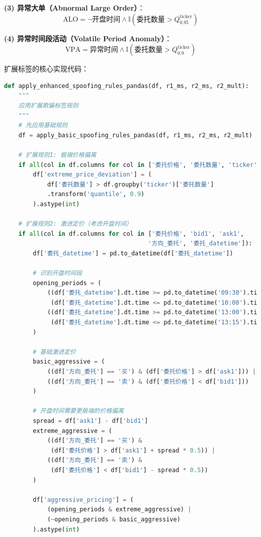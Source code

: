 \documentclass[12pt,a4paper]{article}
\begin{document}
\textbf{(3) 异常大单（Abnormal Large Order）}：
$$\text{ALO} = \neg\text{开盘时间} \land \mathbb{I}(\text{委托数量} > Q_{0.95}^{\text{ticker}})$$

\textbf{(4) 异常时间段活动（Volatile Period Anomaly）}：
$$\text{VPA} = \text{异常时间} \land \mathbb{I}(\text{委托数量} > Q_{0.9}^{\text{ticker}})$$

扩展标签的核心实现代码：

\begin{lstlisting}[language=Python, caption=扩展标签生成代码]
def apply_enhanced_spoofing_rules_pandas(df, r1_ms, r2_ms, r2_mult):
    """
    应用扩展欺骗标签规则
    """
    # 先应用基础规则
    df = apply_basic_spoofing_rules_pandas(df, r1_ms, r2_ms, r2_mult)
    
    # 扩展规则1: 极端价格偏离
    if all(col in df.columns for col in ['委托价格', '委托数量', 'ticker']):
        df['extreme_price_deviation'] = (
            df['委托数量'] > df.groupby('ticker')['委托数量']
            .transform('quantile', 0.9)
        ).astype(int)
    
    # 扩展规则2: 激进定价（考虑开盘时间）
    if all(col in df.columns for col in ['委托价格', 'bid1', 'ask1', 
                                        '方向_委托', '委托_datetime']):
        df['委托_datetime'] = pd.to_datetime(df['委托_datetime'])
        
        # 识别开盘时间段
        opening_periods = (
            ((df['委托_datetime'].dt.time >= pd.to_datetime('09:30').time()) & 
             (df['委托_datetime'].dt.time <= pd.to_datetime('10:00').time())) |
            ((df['委托_datetime'].dt.time >= pd.to_datetime('13:00').time()) & 
             (df['委托_datetime'].dt.time <= pd.to_datetime('13:15').time()))
        )
        
        # 基础激进定价
        basic_aggressive = (
            ((df['方向_委托'] == '买') & (df['委托价格'] > df['ask1'])) |
            ((df['方向_委托'] == '卖') & (df['委托价格'] < df['bid1']))
        )
        
        # 开盘时间需要更极端的价格偏离
        spread = df['ask1'] - df['bid1']
        extreme_aggressive = (
            ((df['方向_委托'] == '买') & 
             (df['委托价格'] > df['ask1'] + spread * 0.5)) |
            ((df['方向_委托'] == '卖') & 
             (df['委托价格'] < df['bid1'] - spread * 0.5))
        )
        
        df['aggressive_pricing'] = (
            (opening_periods & extreme_aggressive) |
            (~opening_periods & basic_aggressive)
        ).astype(int)
    

\end{lstlisting}
\end{document}
